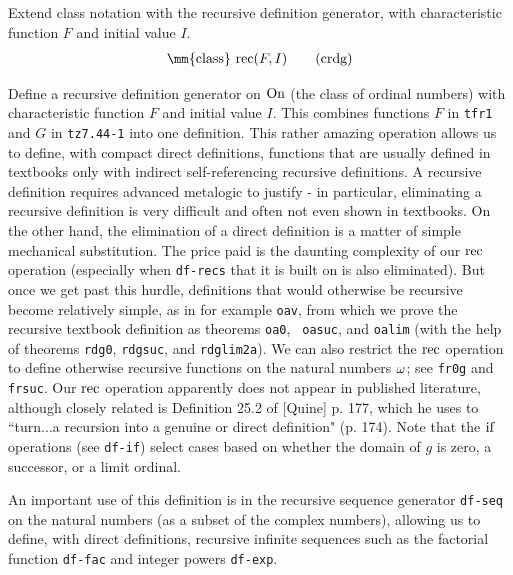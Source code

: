 
\begin{metadefinition} Extend class notation with the recursive
definition generator, with
     characteristic function $F$ and initial value $I$.
\begin{align}
{\rm \mm{class}~} {\rm rec} ( F , I )\label{eq:crdg}\tag{crdg}
\end{align}
\end{metadefinition}

\begin{metadefinition} Define a recursive definition generator
on ${\rm On}$ (the class of ordinal
       numbers) with characteristic function $F$ and initial value $I$.
       This combines functions $F$ in {\tt tfr1} and $G$ in {\tt tz7.44-1}
into one
       definition.  This rather amazing operation allows us to define, with
       compact direct definitions, functions that are usually defined in
       textbooks only with indirect self-referencing recursive definitions.  A
       recursive definition requires advanced metalogic to justify - in
       particular, eliminating a recursive definition is very difficult and
       often not even shown in textbooks.  On the other hand, the elimination
       of a direct definition is a matter of simple mechanical substitution.
       The price paid is the daunting complexity of our ${\rm rec}$ operation
       (especially when {\tt df-recs} that it is built on is also eliminated).
But
       once we get past this hurdle, definitions that would otherwise be
       recursive become relatively simple, as in for example {\tt oav}, from
which
       we prove the recursive textbook definition as theorems {\tt oa0}, {\tt
oasuc},
       and {\tt oalim} (with the help of theorems {\tt rdg0}, {\tt rdgsuc},
and
       {\tt rdglim2a}).  We can also restrict the ${\rm rec}$ operation to
define
       otherwise recursive functions on the natural numbers ${\rm \omega}$;
see
       {\tt fr0g} and {\tt frsuc}.  Our ${\rm rec}$ operation apparently does
not appear
       in published literature, although closely related is Definition 25.2 of
       [Quine] p. 177, which he uses to ``turn...a recursion into a genuine or
       direct definition" (p. 174).  Note that the ${\rm if}$ operations (see
       {\tt df-if}) select cases based on whether the domain of $g$ is zero, a
       successor, or a limit ordinal.

       An important use of this definition is in the recursive sequence
       generator {\tt df-seq} on the natural numbers (as a subset of the
complex
       numbers), allowing us to define, with direct definitions, recursive
       infinite sequences such as the factorial function {\tt df-fac} and
integer
       powers {\tt df-exp}.


\end{metadefinition}
